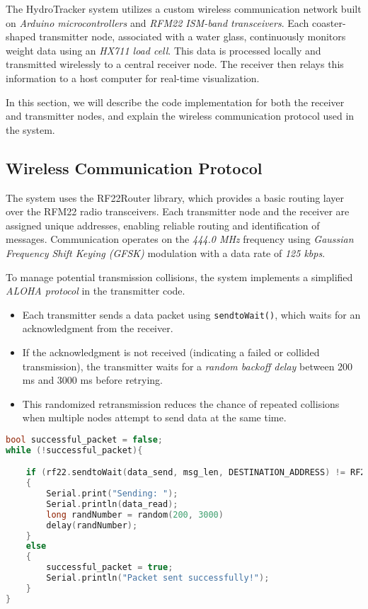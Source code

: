 The HydroTracker system utilizes a custom wireless communication network built on \textit{Arduino microcontrollers} and \textit{RFM22 ISM-band transceivers}. 
Each coaster-shaped transmitter node, associated with a water glass, continuously monitors weight data using an \textit{HX711 load cell}. 
This data is processed locally and transmitted wirelessly to a central receiver node. 
The receiver then relays this information to a host computer for real-time visualization.

In this section, we will describe the code implementation for both the receiver and transmitter nodes, and explain the wireless communication protocol used in the system.

\subsection{Wireless Communication Protocol}

The system uses the RF22Router library, which provides a basic routing layer over the RFM22 radio transceivers. 
Each transmitter node and the receiver are assigned unique addresses, enabling reliable routing and identification of messages. 
Communication operates on the \textit{444.0 MHz} frequency using \textit{Gaussian Frequency Shift Keying (GFSK)} modulation with a data rate of \textit{125 kbps}.

To manage potential transmission collisions, the system implements a simplified \textit{ALOHA protocol} in the transmitter code.

\begin{itemize}
    \item Each transmitter sends a data packet using \texttt{sendtoWait()}, which waits for an acknowledgment from the receiver.
    \item If the acknowledgment is not received (indicating a failed or collided transmission), the transmitter waits for a \textit{random backoff delay} between 200 ms and 3000 ms before retrying.
    \item This randomized retransmission reduces the chance of repeated collisions when multiple nodes attempt to send data at the same time.
\end{itemize}

\begin{lstlisting}[language=C++, caption={ALOHA protocol implementation in the transmitter}]
bool successful_packet = false;
while (!successful_packet){

    if (rf22.sendtoWait(data_send, msg_len, DESTINATION_ADDRESS) != RF22_ROUTER_ERROR_NONE)
    {
        Serial.print("Sending: ");
        Serial.println(data_read);
        long randNumber = random(200, 3000)
        delay(randNumber);
    }
    else
    {
        successful_packet = true;
        Serial.println("Packet sent successfully!");
    }
}
\end{lstlisting}

